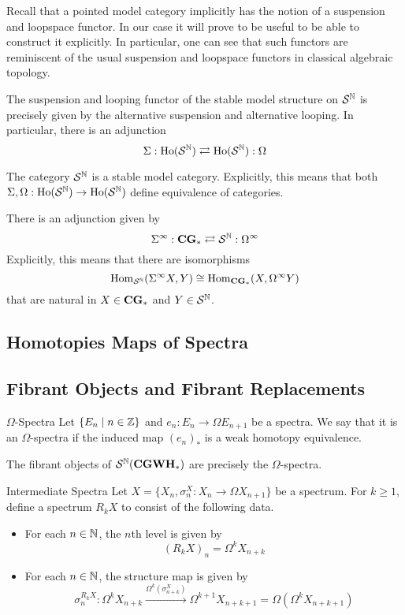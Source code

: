 \documentclass[a4paper]{article}
\begin{document}
Recall that a pointed model category implicitly has the notion of a suspension and loopspace functor. In our case it will prove to be useful to be able to construct it explicitly. In particular, one can see that such functors are reminiscent of the usual suspension and loopspace functors in classical algebraic topology. 

\begin{thm}{}{} The suspension and looping functor of the stable model structure on $\mathcal{S}^{\mathbb{N}}$ is precisely given by the alternative suspension and alternative looping. In particular, there is an adjunction $$\Sigma:\text{Ho}(\mathcal{S}^{\mathbb{N}})\rightleftarrows\text{Ho}(\mathcal{S}^{\mathbb{N}}):\Omega$$
\end{thm}

\begin{thm}{}{} The category $\mathcal{S}^{\mathbb{N}}$ is a stable model category. Explicitly, this means that both $\Sigma,\Omega:\text{Ho}(\mathcal{S}^{\mathbb{N}})\to\text{Ho}(\mathcal{S}^{\mathbb{N}})$ define equivalence of categories. 
\end{thm}

\begin{thm}{}{} There is an adjunction given by $$\Sigma^\infty:\bold{CG}_\ast\rightleftarrows\mathcal{S}^{\mathbb{N}} :\Omega^\infty$$ Explicitly, this means that there are isomorphisms $$\operatorname{Hom}_{\mathcal{S}^{\mathbb{N}} }(\Sigma^\infty X,Y)\cong\operatorname{Hom}_{\bold{CG}_\ast}(X,\Omega^\infty Y)$$ that are natural in $X\in\bold{CG}_\ast$ and $Y\in\mathcal{S}^{\mathbb{N}} $. 
\end{thm}

\subsection{Homotopies Maps of Spectra}

\subsection{Fibrant Objects and Fibrant Replacements}
\begin{defn}{$\Omega$-Spectra}{} Let $\{E_n\;|\;n\in\mathbb{Z}\}$ and $e_n:E_n\to\Omega E_{n+1}$ be a spectra. We say that it is an $\Omega$-spectra if the induced map $(e_n)_\ast$ is a weak homotopy equivalence. 
\end{defn}

\begin{prp}{}{} The fibrant objects of $\mathcal{S}^{\mathbb{N}}(\bold{CGWH}_\ast)$ are precisely the $\Omega$-spectra. 
\end{prp}

\begin{defn}{Intermediate Spectra}{} Let $X=\{X_n,\sigma_n^X:X_n\to\Omega X_{n+1}\}$ be a spectrum. For $k\geq 1$, define a spectrum $R_kX$ to consist of the following data. 
\begin{itemize}
\item For each $n\in\mathbb{N}$, the $n$th level is given by $$(R_kX)_n=\Omega^k X_{n+k}$$
\item For each $n\in\mathbb{N}$, the structure map is given by $$\sigma_n^{R_kX}:\Omega^kX_{n+k}\overset{\Omega^k(\sigma_{n+k}^X)}{\longrightarrow}\Omega^{k+1}X_{n+k+1}=\Omega(\Omega^kX_{n+k+1})$$
\end{itemize}
\end{defn}
\end{document}

